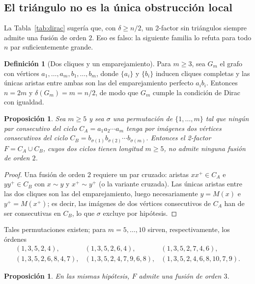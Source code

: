 \documentclass[11pt,a4paper]{article}
\newtheorem{proposicion}[teorema]{Proposición}
\theoremstyle{definition}
\newtheorem{definicion}[teorema]{Definición}
\theoremstyle{remark}
\begin{document}
\subsection{El triángulo no es la única obstrucción local}\label{sub:contraejemplo}

La Tabla~\ref{tab:dirac} sugería que, con $\delta\ge n/2$, un 2-factor sin triángulos siempre admite una fusión de orden $2$. Eso es falso: la siguiente familia lo refuta para todo $n$ par suficientemente grande.

\begin{definicion}[Dos cliques y un emparejamiento]
Para $m\ge3$, sea $G_m$ el grafo con vértices $a_1,\dots,a_m,b_1,\dots,b_m$, donde $\{a_i\}$ y $\{b_i\}$ inducen cliques completas y las únicas aristas entre ambas son las del emparejamiento perfecto $a_ib_i$. Entonces $n=2m$ y $\delta(G_m)=m=n/2$, de modo que $G_m$ cumple la condición de Dirac con igualdad.
\end{definicion}

\begin{proposicion}\label{prop:contraej}
Sea $m\ge5$ y sea $\sigma$ una permutación de $\{1,\dots,m\}$ tal que ningún par consecutivo del ciclo $C_A=a_1a_2\cdots a_m$ tenga por imágenes dos vértices consecutivos del ciclo $C_B=b_{\sigma(1)}b_{\sigma(2)}\cdots b_{\sigma(m)}$. Entonces el 2-factor $F=C_A\cup C_B$, cuyos dos ciclos tienen longitud $m\ge5$, no admite ninguna fusión de orden $2$.
\end{proposicion}

\begin{proof}
Una fusión de orden $2$ requiere un par cruzado: aristas $xx^+\in C_A$ e $yy^+\in C_B$ con $x\sim y$ y $x^+\sim y^+$ (o la variante cruzada). Las únicas aristas entre las dos cliques son las del emparejamiento, luego necesariamente $y=M(x)$ e $y^+=M(x^+)$; es decir, las imágenes de dos vértices consecutivos de $C_A$ han de ser consecutivas en $C_B$, lo que $\sigma$ excluye por hipótesis.
\end{proof}

Tales permutaciones existen; para $m=5,\dots,10$ sirven, respectivamente, los órdenes
\[
\begin{array}{lll}
(1,3,5,2,4), & (1,3,5,2,6,4), & (1,3,5,2,7,4,6),\\[2pt]
(1,3,5,2,6,8,4,7), & (1,3,5,2,4,7,9,6,8), & (1,3,5,2,4,6,8,10,7,9).
\end{array}
\]

\begin{proposicion}\label{prop:orden3}
En las mismas hipótesis, $F$ admite una fusión de orden $3$.
\end{proposicion}
\end{document}
